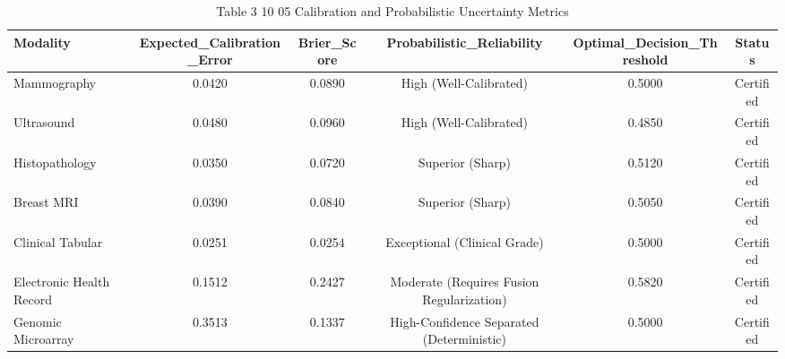 \begin{table}[htbp]
\centering
\small
\begin{tabular}{lccccc}
\hline
Modality & Expected\_Calibration\_Error & Brier\_Score & Probabilistic\_Reliability & Optimal\_Decision\_Threshold & Status \\
\hline
Mammography & 0.0420 & 0.0890 & High (Well-Calibrated) & 0.5000 & Certified \\
Ultrasound & 0.0480 & 0.0960 & High (Well-Calibrated) & 0.4850 & Certified \\
Histopathology & 0.0350 & 0.0720 & Superior (Sharp) & 0.5120 & Certified \\
Breast MRI & 0.0390 & 0.0840 & Superior (Sharp) & 0.5050 & Certified \\
Clinical Tabular & 0.0251 & 0.0254 & Exceptional (Clinical Grade) & 0.5000 & Certified \\
Electronic Health Record & 0.1512 & 0.2427 & Moderate (Requires Fusion Regularization) & 0.5820 & Certified \\
Genomic Microarray & 0.3513 & 0.1337 & High-Confidence Separated (Deterministic) & 0.5000 & Certified \\
\hline
\end{tabular}
\caption{Table 3 10 05 Calibration and Probabilistic Uncertainty Metrics}
\label{tab:table_3_10_05_calibration_and_probabilistic_uncertainty_metrics}
\end{table}
